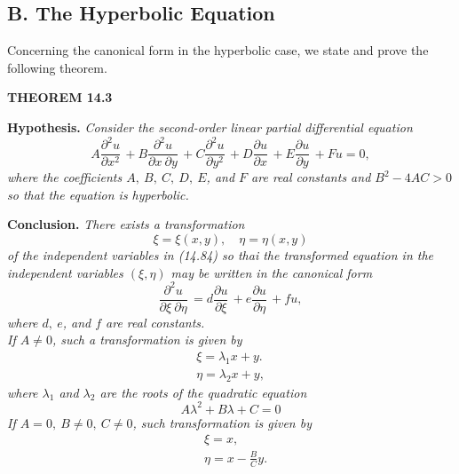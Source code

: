 \documentclass[11pt,a4paper, twoside]{report}
\newcommand{\pf}[2]{\dfrac{\partial #1}{\partial #2}\,}
\newcommand{\pfn}[3]{\dfrac{\partial^#3 #1}{\partial #2^#3}\,}
\newcommand{\pfp}[4]{\dfrac{\partial^#4 #1}{\partial #2\ \partial #3}\,}
\begin{document}
	\subsection*{B. The Hyperbolic Equation}
	Concerning the canonical form in the hyperbolic case, we state and prove the following theorem.\par
	\textbf{\large THEOREM 14.3}\par
	\textbf{Hypothesis.} \textit{Consider the second-order linear partial differential equation}
	\begin{equation}\tag{14.84}
		A\pfn{u}{x}{2} + B\pfp{u}{x}{y}{2} + C \pfn{u}{y}{2} + D\pf{u}{x} + E\pf{u}{y} + Fu = 0,
	\end{equation}
	\textit{where the coefficients $A,\ B,\ C,\ D,\ E$, and $F$ are real constants and $B^2 - 4AC > 0$ so that the equation is hyperbolic.}\par
	\textbf{Conclusion.} \textit{There exists a transformation}
	\begin{equation}\tag{14.85}
		\xi = \xi(x, y),\quad \eta = \eta(x,y)
	\end{equation} 
	\textit{of the independent variables in (14.84) so thai the transformed equation in the independent variables $(\xi, \eta)$ may be written in the canonical form}
	\begin{equation}\tag{14.94}
		\pfp{u}{\xi}{\eta}{2} = d\pf{u}{\xi} + e\pf{u}{\eta} + fu,
	\end{equation}
	\textit{where $d,\ e$, and $f$ are real constants.}\\
	\textit{If $A \neq 0$, such a transformation is given by}
	\begin{equation}\tag{14.95}
		\begin{aligned}
			\xi = \lambda_1x + y.\\
			\eta = \lambda_2x + y,
		\end{aligned}
	\end{equation}
	\textit{where $\lambda_1$ and $\lambda_2$ are the roots of the quadratic equation}
	\begin{equation}\tag{14.96}
		A\lambda^2 + B\lambda + C = 0
	\end{equation}
	\textit{If $A = 0,\ B\neq 0,\ C \neq 0$, such transformation is given by}
	\begin{equation}\tag{14.97}
		\begin{aligned}
			& \xi = x,\\
			& \eta = x - \frac{B}{C}y.
		\end{aligned}
	\end{equation}
\end{document}
